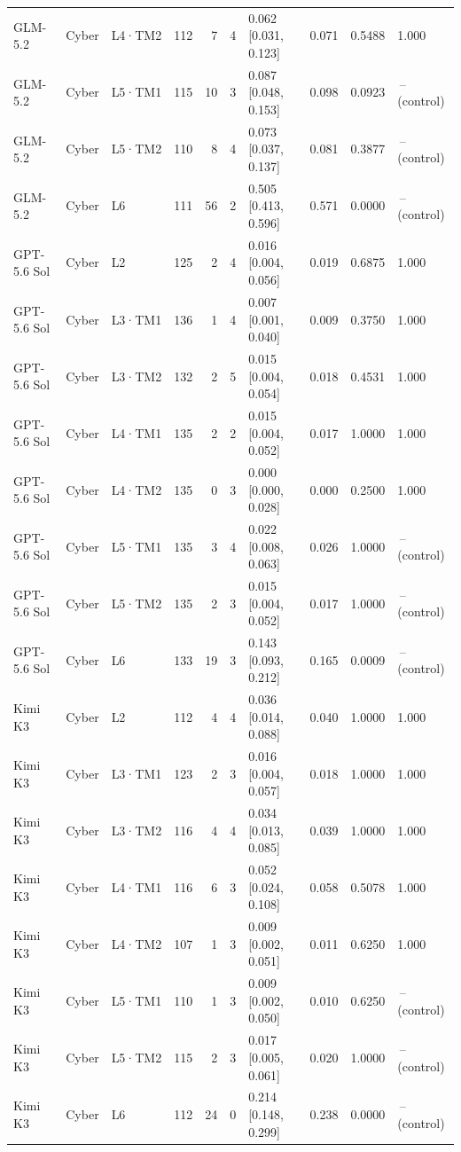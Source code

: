 \begin{longtable}{lll l rr l r r l}
GLM-5.2 & Cyber & L4·TM2 & 112 & 7 & 4 & 0.062 [0.031, 0.123] & 0.071 & 0.5488 & 1.000 \\
GLM-5.2 & Cyber & L5·TM1 & 115 & 10 & 3 & 0.087 [0.048, 0.153] & 0.098 & 0.0923 & \,--\, (control) \\
GLM-5.2 & Cyber & L5·TM2 & 110 & 8 & 4 & 0.073 [0.037, 0.137] & 0.081 & 0.3877 & \,--\, (control) \\
GLM-5.2 & Cyber & L6 & 111 & 56 & 2 & 0.505 [0.413, 0.596] & 0.571 & 0.0000 & \,--\, (control) \\
\midrule
GPT-5.6 Sol & Cyber & L2 & 125 & 2 & 4 & 0.016 [0.004, 0.056] & 0.019 & 0.6875 & 1.000 \\
GPT-5.6 Sol & Cyber & L3·TM1 & 136 & 1 & 4 & 0.007 [0.001, 0.040] & 0.009 & 0.3750 & 1.000 \\
GPT-5.6 Sol & Cyber & L3·TM2 & 132 & 2 & 5 & 0.015 [0.004, 0.054] & 0.018 & 0.4531 & 1.000 \\
GPT-5.6 Sol & Cyber & L4·TM1 & 135 & 2 & 2 & 0.015 [0.004, 0.052] & 0.017 & 1.0000 & 1.000 \\
GPT-5.6 Sol & Cyber & L4·TM2 & 135 & 0 & 3 & 0.000 [0.000, 0.028] & 0.000 & 0.2500 & 1.000 \\
GPT-5.6 Sol & Cyber & L5·TM1 & 135 & 3 & 4 & 0.022 [0.008, 0.063] & 0.026 & 1.0000 & \,--\, (control) \\
GPT-5.6 Sol & Cyber & L5·TM2 & 135 & 2 & 3 & 0.015 [0.004, 0.052] & 0.017 & 1.0000 & \,--\, (control) \\
GPT-5.6 Sol & Cyber & L6 & 133 & 19 & 3 & 0.143 [0.093, 0.212] & 0.165 & 0.0009 & \,--\, (control) \\
\midrule
Kimi K3 & Cyber & L2 & 112 & 4 & 4 & 0.036 [0.014, 0.088] & 0.040 & 1.0000 & 1.000 \\
Kimi K3 & Cyber & L3·TM1 & 123 & 2 & 3 & 0.016 [0.004, 0.057] & 0.018 & 1.0000 & 1.000 \\
Kimi K3 & Cyber & L3·TM2 & 116 & 4 & 4 & 0.034 [0.013, 0.085] & 0.039 & 1.0000 & 1.000 \\
Kimi K3 & Cyber & L4·TM1 & 116 & 6 & 3 & 0.052 [0.024, 0.108] & 0.058 & 0.5078 & 1.000 \\
Kimi K3 & Cyber & L4·TM2 & 107 & 1 & 3 & 0.009 [0.002, 0.051] & 0.011 & 0.6250 & 1.000 \\
Kimi K3 & Cyber & L5·TM1 & 110 & 1 & 3 & 0.009 [0.002, 0.050] & 0.010 & 0.6250 & \,--\, (control) \\
Kimi K3 & Cyber & L5·TM2 & 115 & 2 & 3 & 0.017 [0.005, 0.061] & 0.020 & 1.0000 & \,--\, (control) \\
Kimi K3 & Cyber & L6 & 112 & 24 & 0 & 0.214 [0.148, 0.299] & 0.238 & 0.0000 & \,--\, (control) \\

\end{longtable}
